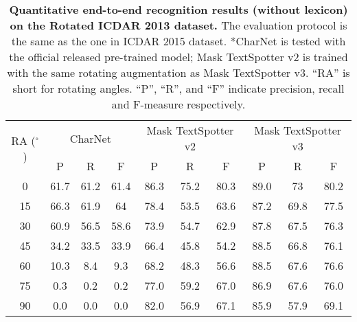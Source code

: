 \documentclass[runningheads]{llncs}
\begin{document}
\begin{table*}[ht]
    \setlength{\tabcolsep}{8.0pt}
    \centering
    \caption{\textbf{Quantitative end-to-end recognition results (without lexicon) on the Rotated ICDAR 2013 dataset.} The evaluation protocol is the same as the one in ICDAR 2015 dataset. *CharNet is tested with the official released pre-trained model; Mask TextSpotter v2 is trained with the same rotating augmentation as Mask TextSpotter v3. ``RA'' is short for rotating angles. ``P'', ``R'', and ``F'' indicate precision, recall and F-measure respectively.}
    \label{tab:rotated_ic13_rec}
    \begin{tabularx}{1.0\textwidth}{c*{9}c}
    \toprule
    \multirow{2}{*}{RA ($^\circ$)} & \multicolumn{3}{c}{CharNet} & \multicolumn{3}{c}{Mask TextSpotter v2} & \multicolumn{3}{c}{Mask TextSpotter v3} \\ \cline{2-10} 
                                     & P        & R       & F       & P            & R           & F           & P          & R          & F          \\ 
    \midrule
    0                                & 61.7     & 61.2    & 61.4    & 86.3         & 75.2        & 80.3        & 89.0         & 73         & 80.2       \\ 
    15                               & 66.3     & 61.9    & 64      & 78.4         & 53.5        & 63.6        & 87.2       & 69.8       & 77.5       \\ 
    30                               & 60.9     & 56.5    & 58.6    & 73.9         & 54.7        & 62.9        & 87.8       & 67.5       & 76.3       \\ 
    45                               & 34.2     & 33.5    & 33.9    & 66.4         & 45.8        & 54.2        & 88.5       & 66.8       & 76.1       \\ 
    60                               & 10.3     & 8.4     & 9.3     & 68.2         & 48.3        & 56.6        & 88.5       & 67.6       & 76.6       \\ 
    75                               & 0.3      & 0.2     & 0.2     & 77.0         & 59.2        & 67.0        & 86.9       & 67.6       & 76.0       \\ 
    90                               & 0.0      & 0.0     & 0.0     & 82.0         & 56.9        & 67.1        & 85.9       & 57.9       & 69.1       \\ 
    \bottomrule  
    \end{tabularx}
\end{table*}
\end{document}
